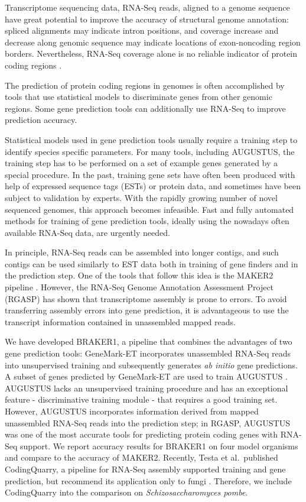 \documentclass{bioinfo}
\begin{document}
Transcriptome sequencing data, RNA-Seq reads, aligned to a genome sequence have great potential to improve the accuracy of structural genome annotation: spliced alignments may indicate intron positions, and coverage increase and decrease along genomic sequence may indicate locations of exon-noncoding region borders. Nevertheless, RNA-Seq coverage alone is no reliable indicator of protein coding regions \citep{InsectOpinion2015}. 

The prediction of protein coding regions in genomes is often accomplished by tools that use statistical models to discriminate genes from other genomic regions. Some gene prediction tools can additionally use RNA-Seq 
 to improve prediction accuracy.

Statistical models used in gene prediction tools usually require a training  step to identify species specific parameters. For many tools, including AUGUSTUS, the training step has to be performed on a set of example genes generated by a special procedure. In the past, training gene sets have often been produced with help of expressed sequence tags (ESTs) or protein data, and sometimes have been subject to validation by experts. With the rapidly growing number of novel sequenced genomes, this approach becomes infeasible. Fast and fully automated methods for training of gene prediction tools, ideally using the nowadays often available RNA-Seq data, are urgently needed.

In principle, RNA-Seq reads can be assembled into longer contigs, and such contigs can be used similarly to EST data both in training of gene finders and in the prediction step. One of the tools that follow this idea is the MAKER2 pipeline \citep{MAKER2}. However, the RNA-Seq Genome Annotation Assessment Project (RGASP) \citep{RGASP} has shown that transcriptome assembly is prone to errors. To avoid transferring assembly errors into gene prediction, it is advantageous to use the transcript information contained in unassembled mapped reads.

We have developed BRAKER1, a pipeline that combines the advantages of two gene prediction tools: GeneMark-ET \citep{GeneMark-ET} incorporates unassembled RNA-Seq reads into unsupervised training and subsequently generates \textit{ab initio} gene predictions. A subset of genes predicted by GeneMark-ET are used to train AUGUSTUS \citep{AUGUSTUS}. AUGUSTUS lacks an unsupervised training procedure and has an exceptional feature - discriminative training module - that requires a good training set. However, AUGUSTUS incorporates information derived from mapped unassembled RNA-Seq reads into the prediction step; in RGASP, AUGUSTUS was one of the most accurate tools for predicting protein coding genes with RNA-Seq support. We report accuracy results for BRAKER1 on four model organisms and compare to the accuracy of MAKER2. Recently, Testa et al.~published CodingQuarry, a pipeline for RNA-Seq assembly supported training and gene prediction, but recommend its application only to fungi \citep{CodingQuarry}. Therefore, we 
include CodingQuarry into the comparison on \textit{Schizosaccharomyces pombe}.
\end{document}
